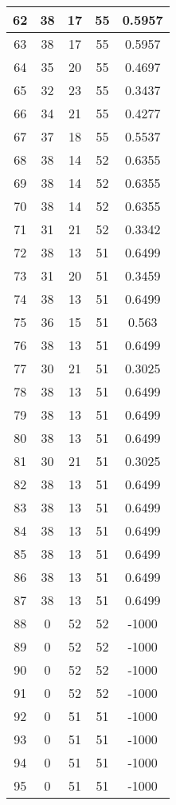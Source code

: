 \documentclass[letterpaper, 12pt]{article}
\begin{document}
\begin{longtable}{|c|c|c|c|c|}
\hline
62 & 38 & 17 & 55 & 0.5957 \\
\hline
63 & 38 & 17 & 55 & 0.5957 \\
\hline
64 & 35 & 20 & 55 & 0.4697 \\
\hline
65 & 32 & 23 & 55 & 0.3437 \\
\hline
66 & 34 & 21 & 55 & 0.4277 \\
\hline
67 & 37 & 18 & 55 & 0.5537 \\
\hline
68 & 38 & 14 & 52 & 0.6355 \\
\hline
69 & 38 & 14 & 52 & 0.6355 \\
\hline
70 & 38 & 14 & 52 & 0.6355 \\
\hline
71 & 31 & 21 & 52 & 0.3342 \\
\hline
72 & 38 & 13 & 51 & 0.6499 \\
\hline
73 & 31 & 20 & 51 & 0.3459 \\
\hline
74 & 38 & 13 & 51 & 0.6499 \\
\hline
75 & 36 & 15 & 51 & 0.563 \\
\hline
76 & 38 & 13 & 51 & 0.6499 \\
\hline
77 & 30 & 21 & 51 & 0.3025 \\
\hline
78 & 38 & 13 & 51 & 0.6499 \\
\hline
79 & 38 & 13 & 51 & 0.6499 \\
\hline
80 & 38 & 13 & 51 & 0.6499 \\
\hline
81 & 30 & 21 & 51 & 0.3025 \\
\hline
82 & 38 & 13 & 51 & 0.6499 \\
\hline
83 & 38 & 13 & 51 & 0.6499 \\
\hline
84 & 38 & 13 & 51 & 0.6499 \\
\hline
85 & 38 & 13 & 51 & 0.6499 \\
\hline
86 & 38 & 13 & 51 & 0.6499 \\
\hline
87 & 38 & 13 & 51 & 0.6499 \\
\hline
88 & 0 & 52 & 52 & -1000 \\
\hline
89 & 0 & 52 & 52 & -1000 \\
\hline
90 & 0 & 52 & 52 & -1000 \\
\hline
91 & 0 & 52 & 52 & -1000 \\
\hline
92 & 0 & 51 & 51 & -1000 \\
\hline
93 & 0 & 51 & 51 & -1000 \\
\hline
94 & 0 & 51 & 51 & -1000 \\
\hline
95 & 0 & 51 & 51 & -1000 \\

\end{longtable}
\end{document}
